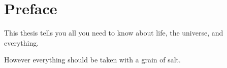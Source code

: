 \chapter*{Preface}


This thesis tells you all you need to know about life, the universe,
and everything.

\newpage

However everything should be taken with a grain of salt.
